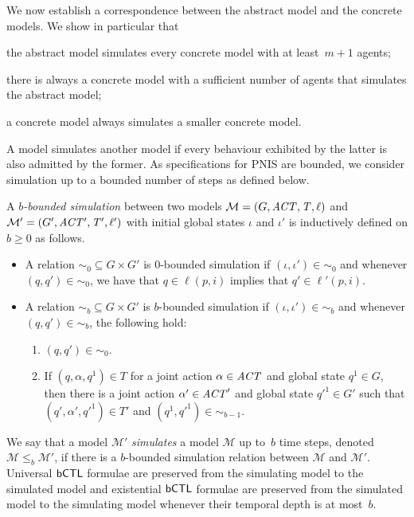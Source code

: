 We now establish a correspondence between the abstract model and the concrete
models. We show in particular that
\begin{inparaenum}[\it (i)]
\item the abstract model simulates every concrete model with at least~$m+1$
  agents;
\item there is always a concrete model with a sufficient number of agents that
  simulates the abstract model;
\item a concrete model always simulates a smaller concrete model.
\end{inparaenum}
A model simulates another
model if every behaviour exhibited by the latter is also admitted by the former.
As specifications for PNIS are bounded, we consider simulation up to a bounded
number of steps as defined below.

\begin{definition}
  A \emph{$b$-bounded simulation} between two models
  $\mathcal M = \left ( G, \it{ACT}, T, \ell \right )$ and
  $\mathcal{M'} = \left ( G', \it{ACT'}, T', \ell' \right )$ with initial global states
  $\iota$ and $\iota'$ is inductively defined on $b \geq 0$ as follows.
  \begin{itemize}[$\bullet$]
  \item A relation $\sim_0 \subseteq G \times G'$ is $0$-bounded simulation if
    $(\iota, \iota') \in \sim_0$ and whenever $(q, q') \in \sim_0$, we have
    that $q \in \ell(p,i)$ implies that $q' \in \ell'(p, i)$.
  \item A relation $\sim_b \subseteq G \times G'$ is $b$-bounded simulation if
    $(\iota, \iota') \in \sim_b$ and whenever $(q, q') \in \sim_b$, the
    following hold:
    \begin{enumerate}[1.]
    \item $(q, q') \in \sim_0$.
    \item If $(q, \alpha, q^1) \in T$ for a joint action $\alpha \in \it{ACT}$
      and global state $q^1 \in G$, then there is a joint action
      $\alpha' \in \it{ACT}'$ and global state $q'^1 \in G'$ such that
      $(q', \alpha', q'^1) \in T'$ and $(q^1, q'^1) \in \sim_{b - 1}$.
    \end{enumerate}
  \end{itemize}
\end{definition}

We say that a model $\mathcal{M'}$ \emph{simulates} a model $\mathcal M$ up
to~$b$ time steps, denoted $\mathcal M \leq_b \mathcal{M'}$, if there is a
$b$-bounded simulation relation between $\mathcal M$ and $\mathcal{M'}$.
Universal $\sf{bCTL}$ formulae are preserved from the simulating model to the
simulated model and existential $\sf{bCTL}$ formulae are preserved from the
simulated model to the simulating model whenever their temporal depth is at
most~$b$.

